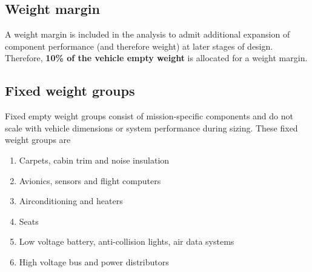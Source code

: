 \subsection{Weight margin}
A weight margin is included in the analysis to admit additional expansion of component performance (and therefore weight) at later stages of design. Therefore, \textbf{10\% of the vehicle empty weight} is allocated for a weight margin. 

\subsection{Fixed weight groups}
Fixed empty weight groups consist of mission-specific components and do not scale with vehicle dimensions or system performance during sizing. These fixed weight groups are 
\begin{enumerate}
\item Carpets, cabin trim and noise insulation
\item Avionics, sensors and flight computers
\item Airconditioning and heaters
\item Seats
\item Low voltage battery, anti-collision lights, air data systems 
\item High voltage bus and power distributors
\end{enumerate}